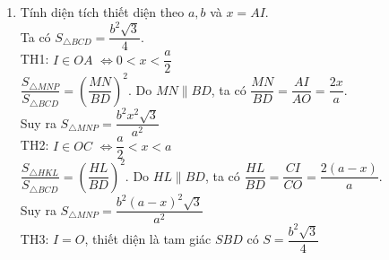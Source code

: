 \begin{vd}
{\begin{enumerate}
			Thiết diện là tam giác đều $MNP$ (vì đồng dạng với tam giác đều $SBD$)\\
			TH2: $I \in OC$. Ta có thiết diện là tam giác đều $HKL$ có các cạnh tương ứng song song với cạnh tam giác $SBD$.\\
			TH3: $I=O$, thiết diện là tam giác $SBD$
			\item Tính diện tích thiết diện theo $a,b$ và $x=AI$.\\
			Ta có $S_{\triangle BCD}=\dfrac{b^2\sqrt{3}}{4}$.\\
			TH1: $I \in OA$ $\Leftrightarrow 0<x<\dfrac{a}{2}$\\
			$\dfrac{S_{\triangle MNP}}{S_{\triangle BCD}}=\left(\dfrac{MN}{BD}\right)^2$. Do $MN \parallel BD$, ta có $\dfrac{MN}{BD}=\dfrac{AI}{AO}=\dfrac{2x}{a}$.\\
			Suy ra $S_{\triangle MNP}=\dfrac{b^2x^2\sqrt{3}}{a^2}$\\
			TH2: $I \in OC$ $\Leftrightarrow \dfrac{a}{2}<x<a$\\
			$\dfrac{S_{\triangle HKL}}{S_{\triangle BCD}}=\left(\dfrac{HL}{BD}\right)^2$. Do $HL \parallel BD$, ta có $\dfrac{HL}{BD}=\dfrac{CI}{CO}=\dfrac{2(a-x)}{a}$.\\
			Suy ra $S_{\triangle MNP}=\dfrac{b^2(a-x)^2\sqrt{3}}{a^2}$\\
			TH3: $I=O$, thiết diện là tam giác $SBD$ có $S=\dfrac{b^2\sqrt{3}}{4}$
		\end{enumerate}
		
	}
\end{vd}

